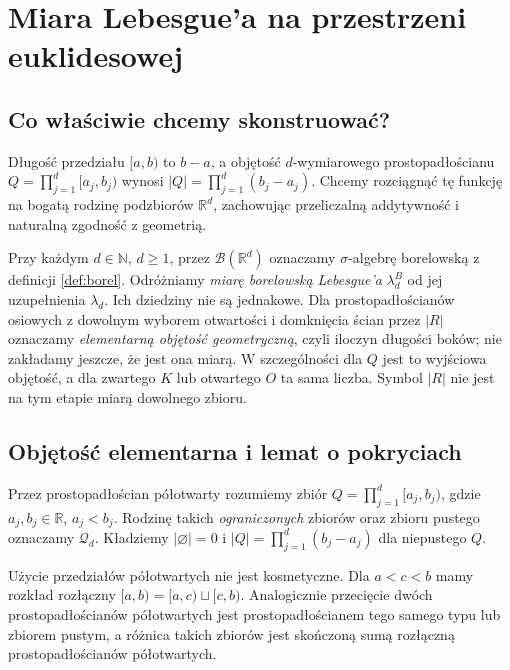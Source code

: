\chapter{Miara Lebesgue'a na przestrzeni euklidesowej}
\label{ch:lebesgue}

\section{Co właściwie chcemy skonstruować?}

Długość przedziału $[a,b)$ to $b-a$, a objętość
$d$-wymiarowego prostopadłościanu
$Q=\prod_{j=1}^d[a_j,b_j)$ wynosi
$|Q|=\prod_{j=1}^d(b_j-a_j)$.
Chcemy rozciągnąć tę funkcję na bogatą rodzinę
podzbiorów $\mathbb R^d$, zachowując przeliczalną
addytywność i naturalną zgodność z geometrią.

Przy każdym $d\in\mathbb N$, $d\ge1$, przez
$\mathcal B(\mathbb R^d)$ oznaczamy $\sigma$-algebrę
borelowską z definicji \ref{def:borel}. Odróżniamy
\emph{miarę borelowską Lebesgue'a} $\lambda_d^B$
od jej uzupełnienia $\lambda_d$. Ich dziedziny nie są
jednakowe. Dla prostopadłościanów osiowych z dowolnym wyborem
otwartości i domknięcia ścian przez $|R|$ oznaczamy
\emph{elementarną objętość geometryczną}, czyli iloczyn
długości boków; nie zakładamy jeszcze, że jest ona miarą.
W szczególności dla $Q$ jest to wyjściowa objętość,
a dla zwartego $K$ lub otwartego $O$ ta sama liczba.
Symbol $|R|$ nie jest na tym etapie miarą dowolnego zbioru.

\section{Objętość elementarna i lemat o pokryciach}

\begin{definicja}
\label{def:halfopen-box}
Przez prostopadłościan półotwarty rozumiemy zbiór
$Q=\prod_{j=1}^d[a_j,b_j)$, gdzie $a_j,b_j\in\mathbb R$,
$a_j<b_j$. Rodzinę takich \emph{ograniczonych} zbiorów
oraz zbioru pustego oznaczamy $\mathcal Q_d$.
Kładziemy $|\varnothing|=0$ i
$|Q|=\prod_{j=1}^d(b_j-a_j)$ dla niepustego $Q$.
\end{definicja}

Użycie przedziałów półotwartych nie jest kosmetyczne.
Dla $a<c<b$ mamy rozkład rozłączny
$[a,b)=[a,c)\sqcup[c,b)$. Analogicznie przecięcie
dwóch prostopadłościanów półotwartych jest
prostopadłościanem tego samego typu lub zbiorem pustym,
a różnica takich zbiorów jest skończoną sumą rozłączną
prostopadłościanów półotwartych.

